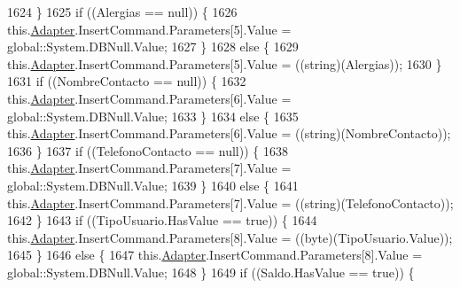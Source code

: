 \begin{DoxyCode}
1624             \}
1625             \textcolor{keywordflow}{if} ((Alergias == null)) \{
1626                 this.\hyperlink{class_proyecto___integrador__3_1_1ds_usuarios_table_adapters_1_1_usuarios_table_adapter_a46252bad9dadbf20130beca25d50b5bc}{Adapter}.InsertCommand.Parameters[5].Value = global::System.DBNull.Value;
1627             \}
1628             \textcolor{keywordflow}{else} \{
1629                 this.\hyperlink{class_proyecto___integrador__3_1_1ds_usuarios_table_adapters_1_1_usuarios_table_adapter_a46252bad9dadbf20130beca25d50b5bc}{Adapter}.InsertCommand.Parameters[5].Value = ((string)(Alergias));
1630             \}
1631             \textcolor{keywordflow}{if} ((NombreContacto == null)) \{
1632                 this.\hyperlink{class_proyecto___integrador__3_1_1ds_usuarios_table_adapters_1_1_usuarios_table_adapter_a46252bad9dadbf20130beca25d50b5bc}{Adapter}.InsertCommand.Parameters[6].Value = global::System.DBNull.Value;
1633             \}
1634             \textcolor{keywordflow}{else} \{
1635                 this.\hyperlink{class_proyecto___integrador__3_1_1ds_usuarios_table_adapters_1_1_usuarios_table_adapter_a46252bad9dadbf20130beca25d50b5bc}{Adapter}.InsertCommand.Parameters[6].Value = ((string)(NombreContacto));
1636             \}
1637             \textcolor{keywordflow}{if} ((TelefonoContacto == null)) \{
1638                 this.\hyperlink{class_proyecto___integrador__3_1_1ds_usuarios_table_adapters_1_1_usuarios_table_adapter_a46252bad9dadbf20130beca25d50b5bc}{Adapter}.InsertCommand.Parameters[7].Value = global::System.DBNull.Value;
1639             \}
1640             \textcolor{keywordflow}{else} \{
1641                 this.\hyperlink{class_proyecto___integrador__3_1_1ds_usuarios_table_adapters_1_1_usuarios_table_adapter_a46252bad9dadbf20130beca25d50b5bc}{Adapter}.InsertCommand.Parameters[7].Value = ((string)(TelefonoContacto));
1642             \}
1643             \textcolor{keywordflow}{if} ((TipoUsuario.HasValue == \textcolor{keyword}{true})) \{
1644                 this.\hyperlink{class_proyecto___integrador__3_1_1ds_usuarios_table_adapters_1_1_usuarios_table_adapter_a46252bad9dadbf20130beca25d50b5bc}{Adapter}.InsertCommand.Parameters[8].Value = ((byte)(TipoUsuario.Value));
1645             \}
1646             \textcolor{keywordflow}{else} \{
1647                 this.\hyperlink{class_proyecto___integrador__3_1_1ds_usuarios_table_adapters_1_1_usuarios_table_adapter_a46252bad9dadbf20130beca25d50b5bc}{Adapter}.InsertCommand.Parameters[8].Value = global::System.DBNull.Value;
1648             \}
1649             \textcolor{keywordflow}{if} ((Saldo.HasValue == \textcolor{keyword}{true})) \{

\end{DoxyCode}
